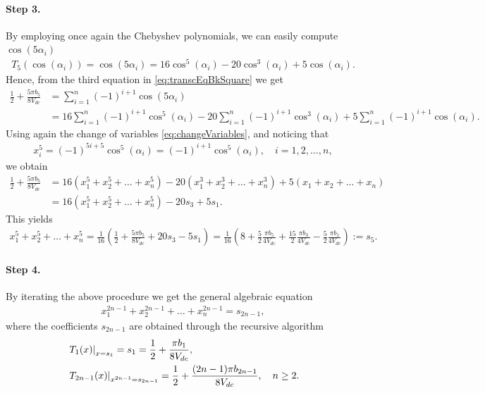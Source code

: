 \documentclass[a4paper]{article}
\numberwithin{equation}{section}
\begin{document}
{\paragraph{Step 3.} By employing once again the Chebyshev polynomials, we can easily compute $\cos(5\alpha_i)$
\begin{align*}
	T_5(\cos(\alpha_i)) = \cos(5\alpha_i) = 16\cos^5(\alpha_i)-20\cos^3(\alpha_i)+5\cos(\alpha_i).
\end{align*}
Hence, from the third equation in \eqref{eq:transcEqBkSquare} we get
\begin{align*}
	\frac 12 + \frac{5\pi b_5}{8V_{dc}} & = \sum_{i=1}^n (-1)^{i+1} \cos (5\alpha_i) 
	\\
	&= 16\sum_{i=1}^n (-1)^{i+1} \cos^5(\alpha_i) - 20\sum_{i=1}^n (-1)^{i+1} \cos^3(\alpha_i) + 5\sum_{i=1}^n (-1)^{i+1} \cos(\alpha_i).
\end{align*}
Using again the change of variables \eqref{eq:changeVariables}, and noticing that 
\begin{align*}
	x_i^5 = (-1)^{5i+5}\cos^5(\alpha_i) = (-1)^{i+1}\cos^5(\alpha_i), \quad i=1,2,\ldots,n,
\end{align*} 
we obtain
\begin{align*}
	\frac 12 + \frac{5\pi b_5}{8V_{dc}} & = 16(x_1^5 + x_2^5 + \ldots + x_n^5) -20(x_1^3 + x_2^3 + \ldots + x_n^3) + 5(x_1 + x_2 + \ldots + x_n) 
	\\
	&= 16(x_1^5 + x_2^5 + \ldots + x_n^5) - 20s_3 + 5s_1.
\end{align*}
This yields
\begin{align*}
	x_1^5 + x_2^5 + \ldots + x_n^5 = \frac{1}{16}\left(\frac 12 + \frac{5\pi b_5}{8V_{dc}} + 20s_3 - 5s_1\right) = \frac{1}{16}\left(8 + \frac 52\frac{\pi b_5}{4V_{dc}} + \frac{15}{2} \frac{\pi b_3}{4V_{dc}} - \frac 52\frac{\pi b_1}{4V_{dc}}\right):=s_5.
\end{align*}

\paragraph{Step 4.} By iterating the above procedure we get the general algebraic equation
\begin{align}
	x_1^{2n-1} + x_2^{2n-1} + \ldots + x_n^{2n-1} = s_{2n-1},
\end{align}
where the coefficients $s_{2n-1}$ are obtained through the recursive algorithm
\begin{align}\label{eq:s_iAlgo}
	&\left. T_1(x)\right|_{x=s_1} = s_1 = \frac 12 +\frac{\pi b_1}{8V_{dc}}, \notag
	\\
	&\left. T_{2n-1}(x)\right|_{x^{2n-1}=s_{2n-1}} = \frac 12 +\frac{(2n-1)\pi b_{2n-1}}{8V_{dc}}, \quad n\geq 2.
\end{align}

}
\end{document}
